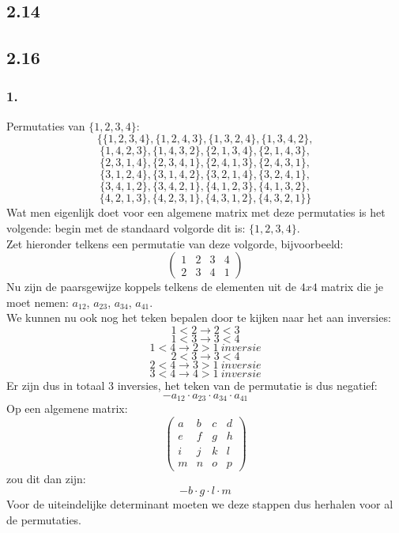 \documentclass[10pt,a4paper]{article}
\begin{document}
\subsection*{2.14}
\subsection*{2.16}
\subsubsection*{1.}
Permutaties van $\{1,2,3,4\}$:
$$
\{\{1, 2, 3, 4\}, \{1, 2, 4, 3\}, \{1, 3, 2, 4\}, \{1, 3, 4, 2\},$$
$$ \{1, 4, 2, 3\}, \{1, 4, 3, 2\}, \{2, 1, 3, 4\}, \{2, 1, 4, 3\}, $$ 
$$\{2, 3, 1, 4\}, \{2, 3, 4, 1\}, \{2, 4, 1, 3\}, \{2, 4, 3, 1\}, $$
$$\{3, 1, 2, 4\}, \{3, 1, 4, 2\}, \{3, 2, 1, 4\}, \{3, 2, 4, 1\}, $$ $$
\{3, 4, 1, 2\}, \{3, 4, 2, 1\}, \{4, 1, 2, 3\}, \{4, 1, 3, 2\}, $$
$$\{4, 2, 1, 3\}, \{4, 2, 3, 1\}, \{4, 3, 1, 2\}, \{4, 3, 2, 1\}\}
$$
Wat men eigenlijk doet voor een algemene matrix met deze permutaties is het volgende: begin met de standaard volgorde dit is: $\{1,2,3,4\}$.\\ Zet hieronder telkens een permutatie van deze volgorde, bijvoorbeeld:
$$\begin{pmatrix}
1 & 2 & 3 & 4\\
2 & 3 & 4 & 1
\end{pmatrix}
$$
Nu zijn de paarsgewijze koppels telkens de elementen uit de $4x4$ matrix die je moet nemen: $a_{12}$, $a_{23}$, $a_{34}$, $a_{41}$.\\
We kunnen nu ook nog het teken bepalen door te kijken naar het aan inversies:\\
$$1 < 2 \rightarrow 2 < 3$$
$$1 < 3 \rightarrow 3 < 4$$
$$1 < 4 \rightarrow 2 > 1 \ inversie$$
$$2 < 3 \rightarrow 3 < 4$$
$$2 < 4 \rightarrow 3 > 1 \ inversie$$
$$3 < 4 \rightarrow 4 > 1 \ inversie$$
Er zijn dus in totaal 3 inversies, het teken van de permutatie is dus negatief:
$$-a_{12}\cdot a_{23}\cdot a_{34}\cdot a_{41}$$
Op een algemene matrix:
$$
\begin{pmatrix}
a & b & c & d\\
e & f & g & h\\
i & j & k & l\\
m & n & o & p
\end{pmatrix}
$$
zou dit dan zijn:
$$-b\cdot g\cdot l\cdot m$$
Voor de uiteindelijke determinant moeten we deze stappen dus herhalen voor al de permutaties.
\end{document}

